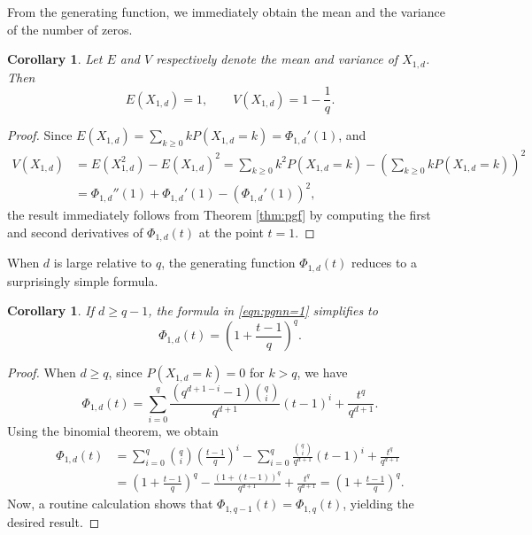 \documentclass[12pt]{amsart}
\newtheorem{corollary}[theorem]{Corollary}
\theoremstyle{definition}
\begin{document}
From the generating function, we immediately obtain the mean and the variance of the number of zeros. 

\begin{corollary}\label{cor:meanandvar}
Let $E$ and $V$ respectively denote the mean and variance of $X_{1,d}$. Then 
\begin{equation}\label{eqn:meanvariance}
E(X_{1,d}) = 1, \qquad V(X_{1,d}) = 1 - \frac{1}{q}.
\end{equation}
\end{corollary}

\begin{proof}
Since $E(X_{1,d}) = \sum_{k \ge 0}k P(X_{1,d} = k) = \Phi_{1,d}'(1)$, and 
\[
\begin{split}
    V(X_{1,d}) &= E(X_{1,d}^2) - E(X_{1,d})^2 = \sum_{k \ge 0}k^2 P(X_{1,d}=k)- \left(\sum_{k \ge 0}kP(X_{1,d}=k)\right)^2\\
    &= \Phi_{1,d}''(1) + \Phi_{1,d}'(1) - (\Phi_{1,d}'(1))^2,
\end{split}
\]
the result immediately follows from Theorem \ref{thm:pgf} by computing the first and second derivatives of $\Phi_{1,d}(t)$ at the point $t = 1$.
\end{proof}

When $d$ is large relative to $q$, the generating function $\Phi_{1,d}(t)$ reduces to a surprisingly simple formula. 

\begin{corollary}\label{cor:pgf}
If $d \ge q-1$, the formula in \eqref{eqn:pgnn=1} simplifies to 
\[
    \Phi_{1,d}(t) = \left(1+\frac{t-1}{q}\right)^q.
\]
\end{corollary}

\begin{proof}
When $d \ge q$, since $P(X_{1,d} = k) = 0$ for $k > q$, we have
\[
    \Phi_{1,d}(t) = \sum_{i=0}^q \frac{(q^{d+1-i}-1){q \choose i}}{q^{d+1}}(t-1)^i + \frac{t^q}{q^{d+1}}.
\]
Using the binomial theorem, we obtain
\[
\begin{split}
\Phi_{1,d}(t) &= \sum_{i=0}^q{q \choose i}\left(\frac{t-1}{q}\right)^i - \sum_{i=0}^q \frac{{q \choose i}}{q^{d+1}}(t-1)^i + \frac{t^q}{q^{d+1}} \\
&= \left(1 + \frac{t-1}{q}\right)^q - \frac{(1+(t-1))^q}{q^{d+1}}+ \frac{t^q}{q^{d+1}} 
= \left(1 + \frac{t-1}{q}\right)^q.
\end{split}
\]
Now, a routine calculation shows that $\Phi_{1,q-1}(t) = \Phi_{1,q}(t)$, yielding the desired result.
\end{proof}
\end{document}
